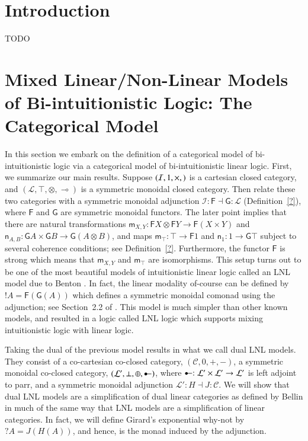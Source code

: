 \documentclass{lmcs}
\let\mto\to
\let\to\relax
\newcommand{\to}{\rightarrow}
\newcommand{\cat}[1]{\mathcal{#1}}
\newcommand{\func}[1]{\mathsf{#1}}
\newcommand{\limp}[0]{\multimap}
\newcommand{\colimp}[0]{\multimapdotinv}
\newcommand{\m}[1]{\mathsf{m}_{#1}}
\newcommand{\n}[1]{\mathsf{n}_{#1}}
\begin{document}
\section{Introduction}
\label{sec:introduction}
TODO \cite{?}

\section{Mixed Linear/Non-Linear Models of Bi-intuitionistic Logic: The Categorical Model}
\label{sec:the_categorical_model}

In this section we embark on the definition of a categorical model of
bi-intuitionistic logic via a categorical model of bi-intuitionistic
linear logic.  First, we summarize our main results.  Suppose
$(\cat{I}, 1, \times, \to)$ is a cartesian closed category, and
$(\cat{L}, \top, \otimes, \limp)$ is a symmetric monoidal closed
category.  Then relate these two categories with a symmetric monoidal
adjunction $\cat{I} : \func{F} \dashv \func{G} : \cat{L}$
(Definition~\ref{?}), where $\func{F}$ and $\func{G}$ are symmetric
monoidal functors.  The later point implies that there are natural
transformations $\m{X,Y} : \func{F}X \otimes \func{F}Y \mto
\func{F}(X \times Y)$ and $\n{A,B} : \func{G}A \times \func{G}B \mto
\func{G}(A \otimes B)$, and maps $\m\top : \top \mto \func{F}1$ and
$\n1 : 1 \mto \func{G}\top$ subject to several coherence conditions;
see Definition~\ref{?}.  Furthermore, the functor $\func{F}$ is strong
which means that $\m{X,Y}$ and $\m{\top}$ are isomorphisms.  This
setup turns out to be one of the most beautiful models of
intuitionistic linear logic called an LNL model due to Benton
\cite{Benton:1994}.  In fact, the linear modality of-course can be
defined by $!A = \func{F}(\func{G}(A))$ which defines a symmetric
monoidal comonad using the adjunction; see Section~2.2 of
\cite{Benton:1994}.  This model is much simpler than other known
models, and resulted in a logic called LNL logic which supports mixing
intuitionistic logic with linear logic.

Taking the dual of the previous model results in what we call dual LNL
models. They consist of a co-cartesian co-closed category, $(\cat{C},
0, +, -)$, a symmetric monoidal co-closed category, $(\cat{L}', \perp,
\oplus, \colimp)$, where $\colimp : \cat{L}' \times \cat{L}' \mto
\cat{L}'$ is left adjoint to parr, and a symmetric monoidal adjunction
$\cat{L'} : H \dashv J : \cat{C}$.  We will show that dual LNL models
are a simplification of dual linear categories as defined by Bellin
\cite{Bellin:2012} in much of the same way that LNL models are a
simplification of linear categories.  In fact, we will define Girard's
exponential why-not by $? A = J(H(A))$, and hence, is the monad
induced by the adjunction.
\end{document}
